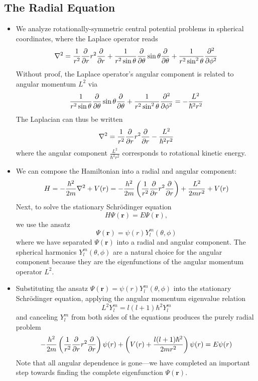 \documentclass[11pt, a4paper]{article}
\renewcommand{\laplacian}{\nabla^{2}}
\newcommand{\Schro}{Schr\"{o}dinger\xspace}
\newcommand{\Ham}{Hamiltonian\xspace}
\renewcommand{\vec}[1]{\bm{#1}}  %
\renewcommand{\r}{\vec{r}}  %
\newcommand{\p}{\psi}  %
\renewcommand{\P}{\Psi}  %
\begin{document}
\subsection{The Radial Equation}
\begin{itemize}
	\item We analyze rotationally-symmetric central potential problems in spherical coordinates, where the Laplace operator reads
	\begin{equation*}
		\laplacian = \frac{1}{r^{2}}\pdv{r}r^{2}\pdv{r} + \frac{1}{r^{2}\sin \theta}\pdv{\theta}\sin \theta \pdv{\theta} + \frac{1}{r^{2}\sin^{2}\theta} \pdv[2]{}{\phi}
	\end{equation*}
	Without proof, the Laplace operator's angular component is related to angular momentum $ L^{2} $ via
	\begin{equation*}
		 \frac{1}{r^{2}\sin \theta}\pdv{\theta}\sin \theta \pdv{\theta} + \frac{1}{r^{2}\sin^{2}\theta} \pdv[2]{}{\phi} = -\frac{L^{2}}{\hbar^{2}r^{2}}
	\end{equation*}
	The Laplacian can thus be written
	\begin{equation*}
		\laplacian = \frac{1}{r^{2}}\pdv{r}r^{2}\pdv{r} -\frac{L^{2}}{\hbar^{2}r^{2}} 
	\end{equation*} 
	where the angular component $ \frac{L^{2}}{\hbar^{2}r^{2}} $ corresponds to rotational kinetic energy.
	
	\item We can compose the \Ham into a radial and angular component:
	\begin{equation*}
		H = -\frac{\hbar^{2}}{2m}\laplacian + V(r) = - \frac{h^{2}}{2m} \left(\frac{1}{r^{2}} \pdv{r}r^{2} \pdv{r}\right) + \frac{L^{2}}{2mr^{2}} + V(r)
	\end{equation*}
	Next, to solve the stationary \Schro equation
	\begin{equation*}
		H\P(\r) = E\P(\r),
	\end{equation*}
	we use the ansatz
	\begin{equation*}
		\P(\r) = \p(r)Y_{l}^{m}(\theta, \phi)
	\end{equation*}
	where we have separated $ \P(\r) $ into a radial and angular component. The spherical harmonics $ Y_{l}^{m}(\theta, \phi) $ are a natural choice for the angular component because they are the eigenfunctions of the angular momentum operator $ L^{2} $.
	
	\item Substituting the ansatz $ \P(\r) = \p(r)Y_{l}^{m}(\theta, \phi) $ into the stationary \Schro equation, applying the angular momentum eigenvalue relation
	\begin{equation*}
		L^{2} Y_{l}^{m} = l (l+1)\hbar^{2} Y_{l}^{m}
	\end{equation*}
	and canceling $ Y_{l}^{m} $ from both sides of the equations produces the purely radial problem
	\begin{equation*}
		- \frac{h^{2}}{2m} \left(\frac{1}{r^{2}} \pdv{r}r^{2} \pdv{r}\right)\p(r) + \left(V(r) + \frac{l (l+1)\hbar^{2}}{2mr^{2}}\right)\p(r) = E\p(r)
	\end{equation*}
	Note that all angular dependence is gone---we have completed an important step towards finding the complete eigenfunction $ \P(\r) $.
	

\end{itemize}
\end{document}
